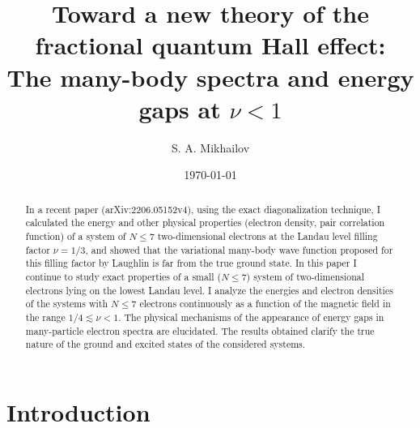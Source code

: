 \documentclass[aps,prb,10pt%
]{revtex4-2}
\begin{document}
\title{Toward a new theory of the fractional quantum Hall effect: \\ The many-body spectra and energy gaps at $\nu<1$}
\author{S. A. Mikhailov}%

\date{\today}

\begin{abstract}
In a recent paper (arXiv:2206.05152v4), using the exact diagonalization technique, I calculated the energy and other physical properties (electron density, pair correlation function) of a system of $N\le 7$ two-dimensional electrons at the Landau level filling factor $\nu=1/3$, and showed that the variational many-body wave function proposed for this filling factor by Laughlin is far from the true ground state. In this paper I continue to study exact properties of a small ($N\le 7$) system of two-dimensional electrons lying on the lowest Landau level. I analyze the energies and electron densities of the systems with $N\le 7$ electrons continuously as a function of the magnetic field in the range $1/4\lesssim\nu<1$. The physical mechanisms of the appearance of energy gaps in many-particle electron spectra are elucidated. The results obtained clarify the true nature of the ground and excited states of the considered systems.
\end{abstract}

\maketitle

\tableofcontents

\section{Introduction\label{sec:intro}}
\end{document}
